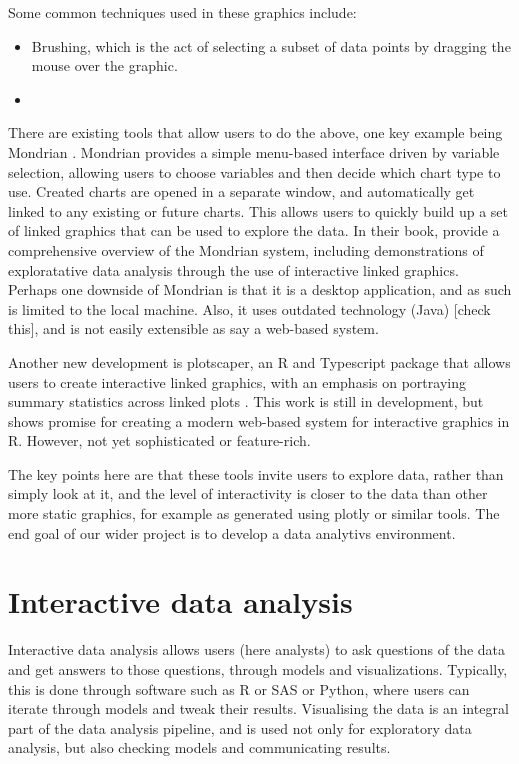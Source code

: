 \documentclass{article}
\newcommand{\prog}[1]{{\sf #1}}
\newcommand{\proglang}[1]{\prog{#1}}
\newcommand{\R}{\prog{R}}
\begin{document}
Some common techniques used in these graphics include:
\begin{itemize}
\item Brushing, which is the act of selecting a subset of data points by dragging the mouse over the graphic.
\item
\end{itemize}

There are existing tools that allow users to do the above, one key example being \proglang{Mondrian} \cite{Theus2014}.
\proglang{Mondrian} provides a simple menu-based interface driven by variable selection, allowing users to choose variables and then decide which chart type to use.
Created charts are opened in a separate window, and automatically get linked to any existing or future charts.
This allows users to quickly build up a set of linked graphics that can be used to explore the data.
In their book, \cite{Theus2014} provide a comprehensive overview of the \proglang{Mondrian} system, including demonstrations of exploratative data analysis through the use of interactive linked graphics.
Perhaps one downside of \proglang{Mondrian} is that it is a desktop application, and as such is limited to the local machine.
Also, it uses outdated technology (Java) [check this], and is not easily extensible as say a web-based system.

Another new development is \proglang{plotscaper}, an \R{} and \proglang{Typescript} package that allows users to create interactive linked graphics, with an emphasis on portraying summary statistics across linked plots \cite{Bartonicek2024}.
This work is still in development, but shows promise for creating a modern web-based system for interactive graphics in \R{}.
However, not yet sophisticated or feature-rich.

The key points here are that these tools invite users to explore data, rather than simply look at it, and the level of interactivity is closer to the data than other more static graphics, for example as generated using plotly or similar tools.
The end goal of our wider project is to develop a data analytivs environment.

\section{Interactive data analysis}
\label{sec:interactive-data-analysis}

Interactive data analysis allows users (here analysts) to ask questions of the data and get answers to those questions, through models and visualizations.
Typically, this is done through software such as \proglang{R} or \proglang{SAS} or \proglang{Python}, where users can iterate through models and tweak their results.
Visualising the data is an integral part of the data analysis pipeline, and is used not only for exploratory data analysis, but also checking models and communicating results.
\end{document}
